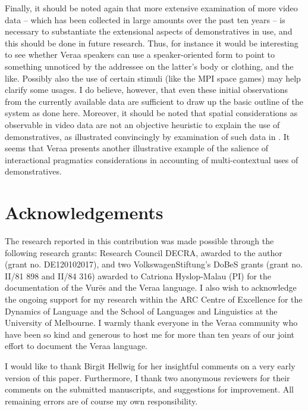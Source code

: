 \documentclass[output=paper
,modfonts
,nonflat]{langsci/langscibook}
\begin{document}
Finally, it should be noted again that more extensive examination of more video data -- which has been collected in large amounts over the past ten years -- is necessary to substantiate the extensional aspects of demonstratives in  use, and this should be done in future research. Thus, for instance it would be interesting to see whether Vera{\textquotesingle}a speakers can use a speaker-oriented form to point to something unnoticed by the addressee on the latter's body or clothing, and the like. Possibly also the use of certain stimuli (like the MPI space games) may help clarify some usages. I do believe, however, that even these initial observations from the currently available data are sufficient to draw up the basic outline of the system as done here. Moreover, it should be noted that spatial considerations as observable in video data are not an objective heuristic to explain the use of demonstratives, as illustrated convincingly by  examination of such data in . It seems that Vera{\textquotesingle}a presents another illustrative example of the salience of interactional pragmatics considerations in accounting of multi-contextual uses of demonstratives.

\section*{Acknowledgements}
The research reported in this contribution was made possible through the following research grants:  Research Council DECRA, awarded to the author (grant no. DE120102017), and two VolkswagenStiftung's DoBeS grants (grant no. II/81 898 and II/84 316) awarded to Catriona Hyslop-Malau (PI) for the documentation of the Vur\"es and the Vera{\textquotesingle}a language. I also wish to acknowledge the ongoing support for my research within the ARC Centre of Excellence for the Dynamics of Language and the School of Languages and Linguistics at the University of Melbourne. I warmly thank everyone in the Vera{\textquotesingle}a community who have been so kind and generous to host me for more than ten years of our joint effort to document the Vera{\textquotesingle}a language.

I would like to thank Birgit Hellwig for her insightful comments on a very early version of this paper. Furthermore, I thank two anonymous reviewers for their comments on the submitted manuscripts, and suggestions for improvement. All remaining errors are of course my own responsibility.
\end{document}
